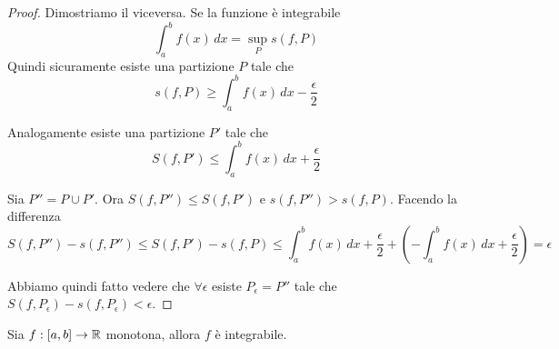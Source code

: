 \begin{proof}
Dimostriamo il viceversa. Se la funzione è integrabile
\begin{equation*}
\int_a^b f(x) \, dx = \sup_P s(f,P)
\end{equation*}
Quindi sicuramente esiste una partizione $P$ tale che
\begin{equation*}
s(f,P) \ge \int_a^b f(x) \, dx - \frac{\epsilon}{2}
\end{equation*}

Analogamente esiste una partizione $P'$ tale che
\begin{equation*}
S(f,P') \le \int_a^b f(x) \, dx + \frac{\epsilon}{2}
\end{equation*}

Sia $P'' = P \cup P'$. Ora $S(f,P'') \le S(f,P')$ e $s(f,P'') > s(f,P)$. Facendo la differenza
\begin{equation*}
S(f,P'') - s(f,P'') \le S(f,P') - s(f,P) \le \int_a^b f(x) \, dx + \frac{\epsilon}{2} + \left (-\int_a^b f(x) \, dx + \frac{\epsilon}{2}\right) = \epsilon
\end{equation*}

Abbiamo quindi fatto vedere che $\forall \epsilon$ esiste $P_\epsilon = P''$ tale che $S(f, P_\epsilon) - s(f,P_\epsilon) < \epsilon$.
\end{proof}

\begin{theorem}
Sia $f:[a,b] \to \mathbb R$ monotona, allora $f$ è integrabile.
\end{theorem}

